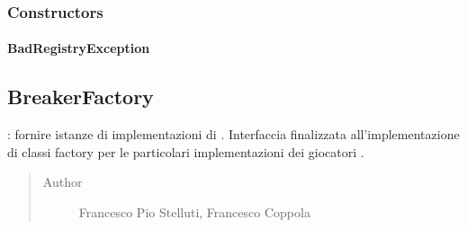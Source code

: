 \documentclass[letterpaper,10pt,italian,openany,oneside]{sphinxmanual}
\begin{document}
\subsubsection{Constructors}
\label{\detokenize{source/it/unicam/cs/pa/mastermind/factories/BadRegistryException:constructors}}

\paragraph{BadRegistryException}
\label{\detokenize{source/it/unicam/cs/pa/mastermind/factories/BadRegistryException:id1}}

\begin{fulllineitems}
\label{\detokenize{source/it/unicam/cs/pa/mastermind/factories/BadRegistryException:it.unicam.cs.pa.mastermind.factories.BadRegistryException.BadRegistryException(String)}}
\end{fulllineitems}



\subsection{BreakerFactory}
\label{\detokenize{source/it/unicam/cs/pa/mastermind/factories/BreakerFactory:breakerfactory}}\label{\detokenize{source/it/unicam/cs/pa/mastermind/factories/BreakerFactory::doc}}

\begin{fulllineitems}
\label{\detokenize{source/it/unicam/cs/pa/mastermind/factories/BreakerFactory:it.unicam.cs.pa.mastermind.factories.BreakerFactory}}
: fornire istanze di implementazioni di . Interfaccia finalizzata all’implementazione di classi factory per le particolari implementazioni dei giocatori .
\begin{quote}\begin{description}
\item[{Author}] \leavevmode
Francesco Pio Stelluti, Francesco Coppola

\end{description}\end{quote}

\end{fulllineitems}
\end{document}
